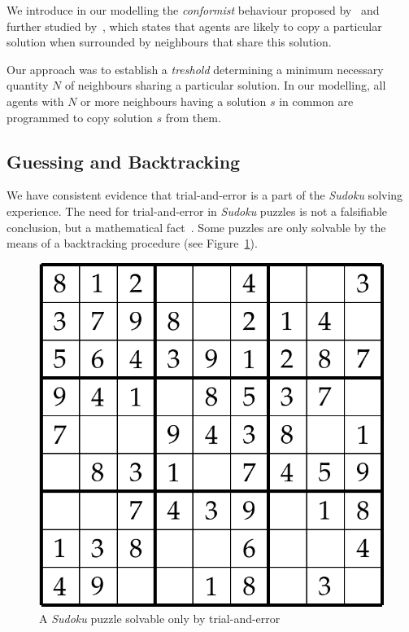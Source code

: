 \documentclass{article}
\begin{document}
We introduce in our modelling the {\em conformist} behaviour proposed by~\cite{cefferson:conformists} and further studied by~\cite{farenzena:collabem}, which states that agents are likely to copy a particular solution when surrounded by neighbours that share this solution. 

Our approach was to establish a {\em treshold} determining a minimum necessary quantity $N$ of neighbours sharing a particular solution. In our modelling, all agents with $N$ or more neighbours having a solution $s$ in common are programmed to copy solution $s$ from them.

\subsection{Guessing and Backtracking}

We have consistent evidence that trial-and-error is a part of the {\em Sudoku} solving experience. The need for trial-and-error in {\em Sudoku} puzzles is not a falsifiable conclusion, but a mathematical fact~\cite{davis:mathsudoku}. Some puzzles are only solvable by the means of a backtracking procedure (see Figure~\ref{fig:trial_and_error_sudoku}).

\begin{figure}
\includegraphics[scale=0.30]{trial_and_error_sudoku}
\caption{A {\em Sudoku} puzzle solvable only by trial-and-error}
\label{fig:trial_and_error_sudoku}
\end{figure}
\end{document}
